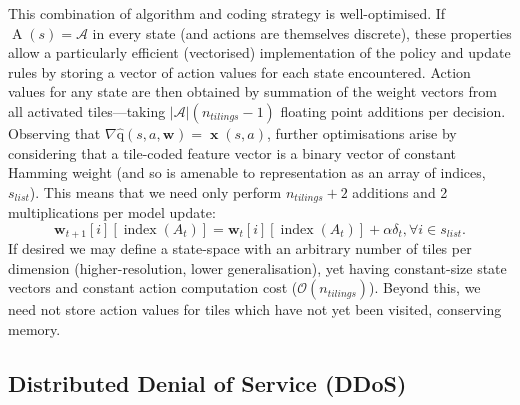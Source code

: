\documentclass[conference, a4paper, 10pt, times]{IEEEtran}
\newcommand{\acval}[3]{\ensuremath{\operatorname{\hat{q}}(#1, #2, #3)}}
\newcommand{\wvec}[1]{\ensuremath{\bm{w}_{#1}}}
\begin{document}
This combination of algorithm and coding strategy is well-optimised.
If $\operatorname{A}(s) = \mathcal{A}$ in every state (and actions are themselves discrete), these properties allow a particularly efficient (vectorised) implementation of the policy and update rules by storing a vector of action values for each state encountered.
Action values for any state are then obtained by summation of the weight vectors from all activated tiles---taking $|\mathcal{A}|(n_{\mathit{tilings}}-1)$ floating point additions per decision.
Observing that $\nabla{\acval{s}{a}{\wvec{}}} = \operatorname{\mathbf{x}}(s, a)$, further optimisations arise by considering that a tile-coded feature vector is a binary vector of constant Hamming weight (and so is amenable to representation as an array of indices, $s_{\mathit{list}}$).
This means that we need only perform $n_{\mathit{tilings}} + 2$ additions and \num{2} multiplications per model update:
\begin{equation}
	\bm{w}_{t+1}[i][\operatorname{index}(A_t)] = \bm{w}_{t}[i][\operatorname{index}(A_t)] + \alpha \delta_t, \forall i \in s_{\mathit{list}}.
	\label{eqn:sg-sarsa-opt}
\end{equation}
If desired we may define a state-space with an arbitrary number of tiles per dimension (higher-resolution, lower generalisation), yet having constant-size state vectors and constant action computation cost ($\mathcal{O}(n_{\mathit{tilings}})$).
Beyond this, we need not store action values for tiles which have not yet been visited, conserving memory.



\subsection{Distributed Denial of Service (DDoS)}
\end{document}
